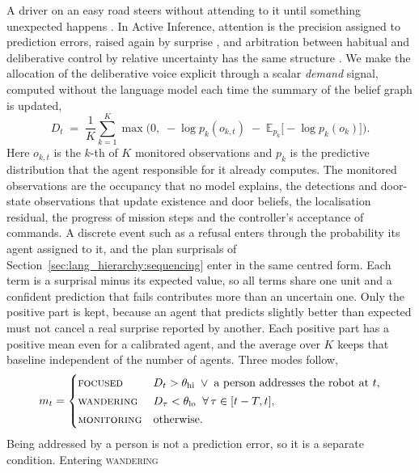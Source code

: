 A driver on an easy road steers without attending to it until something unexpected happens
\cite{smallwood2015science, christoff2016mind}. In Active Inference, attention is the precision assigned to prediction
errors, raised again by surprise \cite{feldman2010attention}, and arbitration between habitual and deliberative
control by relative uncertainty has the same structure \cite{daw2005uncertainty}. We make the allocation of the deliberative voice
explicit through a scalar \emph{demand} signal, computed without the language model each time the summary of the
belief graph is updated,
\begin{equation}
    D_t \;=\; \frac{1}{K}\sum_{k=1}^{K} \max\!\Big(0,\; -\log p_k(o_{k,t}) \;-\; \mathbb{E}_{p_k}\!\big[-\log p_k(o_k)\big] \Big).
    \label{eq:inner_demand}
\end{equation}
Here $o_{k,t}$ is the $k$-th of $K$ monitored observations and $p_k$ is the predictive distribution that the agent
responsible for it already computes. The monitored observations are the occupancy that no model explains, the
detections and door-state observations that update existence and door beliefs, the localisation residual, the
progress of mission steps and the controller's acceptance of commands. A discrete event such as a refusal enters
through the probability its agent assigned to it, and the plan surprisals of Section~\ref{sec:lang_hierarchy:sequencing}
enter in the same centred form. Each term is a surprisal minus its expected value, so all terms share one unit and a
confident prediction that fails contributes more than an uncertain one. Only the positive part is kept, because an
agent that predicts slightly better than expected must not cancel a real surprise reported by another. Each positive
part has a positive mean even for a calibrated agent, and the average over $K$ keeps that baseline independent of the
number of agents. Three modes follow,
\begin{equation}
    m_t =
    \begin{cases}
        \textsc{focused}    & D_t > \theta_{\text{hi}} \;\lor\; \text{a person addresses the robot at } t,\\[2pt]
        \textsc{wandering}  & D_\tau < \theta_{\text{lo}} \;\; \forall\, \tau \in [t - T, t],\\[2pt]
        \textsc{monitoring} & \text{otherwise.}
    \end{cases}
    \label{eq:inner_modes}
\end{equation}
Being addressed by a person is not a prediction error, so it is a separate condition. Entering \textsc{wandering}
